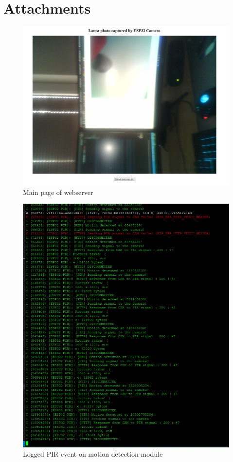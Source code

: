 \documentclass{article}
\begin{document}
    \clearpage
    \section{Attachments}
    \begin{figure}[h!]
        \centering
        \includegraphics[scale=0.35,keepaspectratio]{img/webservermain.png}
        \caption{Main page of webserver}\label{pic:webserverindex}
    \end{figure} 
    \begin{figure}[h!]
        \centering
        \includegraphics[scale=0.43,keepaspectratio]{img/pirevent.png}
        \caption{Logged PIR event on motion detection module}\label{pic:pireventlog}
    \end{figure} 
    \clearpage
	
\end{document}
